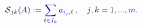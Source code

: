 \documentclass[12pt]{article}
\begin{document}
\makeatletter
\renewcommand*{\@textcolor}[3]{%
  \protect\leavevmode
  \begingroup
    \color#1{#2}#3%
  \endgroup
}
\makeatother
\begin{displaymath}
\mathcal { \mathcolor[RGB]{0,0,15}{S} } _ { \mathcolor[RGB]{0,0,30}{j} \mathcolor[RGB]{0,0,45}{k} } \mathcolor[RGB]{0,0,60}{(} \mathcolor[RGB]{0,0,75}{A} \mathcolor[RGB]{0,0,90}{)} \mathcolor[RGB]{0,0,105}{:} \mathcolor[RGB]{0,0,120}{=} \mathcolor[RGB]{0,0,135}{\sum} _ { \mathcolor[RGB]{0,0,150}{\ell} \mathcolor[RGB]{0,0,165}{\in} \mathcolor[RGB]{0,0,180}{I} _ { \mathcolor[RGB]{0,0,195}{k} } } \mathcolor[RGB]{0,0,210}{a} _ { \mathcolor[RGB]{0,0,225}{i} _ { \mathcolor[RGB]{0,0,240}{j} } \mathcolor[RGB]{0,0,255}{,} \mathcolor[RGB]{0,15,0}{\ell} } \, \mathcolor[RGB]{0,15,15}{,} \quad \mathcolor[RGB]{0,15,30}{j} \mathcolor[RGB]{0,15,45}{,} \mathcolor[RGB]{0,15,60}{k} \mathcolor[RGB]{0,15,75}{=} \mathcolor[RGB]{0,15,90}{1} \mathcolor[RGB]{0,15,105}{,} \mathcolor[RGB]{0,15,120}{.} \mathcolor[RGB]{0,15,135}{.} \mathcolor[RGB]{0,15,150}{.} \mathcolor[RGB]{0,15,165}{,} \mathcolor[RGB]{0,15,180}{m} \mathcolor[RGB]{0,15,195}{.}
\end{displaymath}
\end{document}
